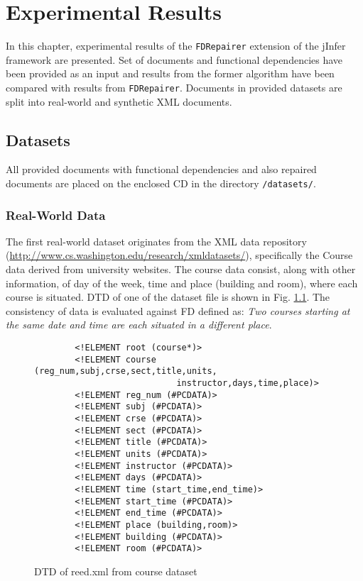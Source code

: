 \chapter{Experimental Results}

In this chapter, experimental results of the \texttt{FDRepairer} extension of the jInfer framework are presented. Set of documents and functional dependencies have been provided as an input and results from the former algorithm have been compared with results from \texttt{FDRepairer}. Documents in provided datasets are split into real-world and synthetic XML documents.

\section{Datasets}

All provided documents with functional dependencies and also repaired documents are placed on the enclosed CD in the directory \texttt{/datasets/}.

\subsection{Real-World Data}

The first real-world dataset originates from the XML data repository \\(\url{http://www.cs.washington.edu/research/xmldatasets/}), specifically the Course data derived from university websites. The course data consist, along with other information, of day of the week, time and place (building and room), where each course is situated. DTD of one of the dataset file is shown in Fig. \ref{courseDTD}. The consistency of data is evaluated against FD defined as: \emph{Two courses starting at the same date and time are each situated in a different place}.\\

\begin{figure}
    \begin{verbatim}
        <!ELEMENT root (course*)>
        <!ELEMENT course (reg_num,subj,crse,sect,title,units,
                            instructor,days,time,place)>
        <!ELEMENT reg_num (#PCDATA)>
        <!ELEMENT subj (#PCDATA)>
        <!ELEMENT crse (#PCDATA)>
        <!ELEMENT sect (#PCDATA)>
        <!ELEMENT title (#PCDATA)>
        <!ELEMENT units (#PCDATA)>
        <!ELEMENT instructor (#PCDATA)>
        <!ELEMENT days (#PCDATA)>
        <!ELEMENT time (start_time,end_time)>
        <!ELEMENT start_time (#PCDATA)>
        <!ELEMENT end_time (#PCDATA)>
        <!ELEMENT place (building,room)>
        <!ELEMENT building (#PCDATA)>
        <!ELEMENT room (#PCDATA)>
    \end{verbatim}
    \caption{DTD of reed.xml from course dataset}
    \label{courseDTD}
\end{figure}


